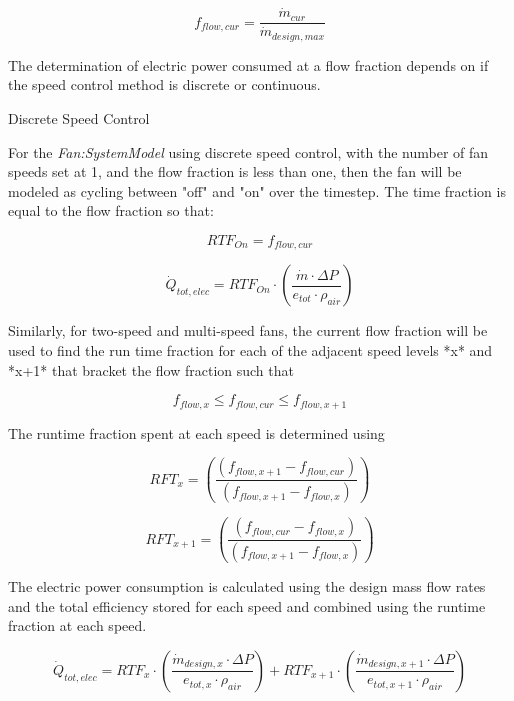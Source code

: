 \begin{equation}
{f_{flow, cur}} = \frac{\dot m_{cur}}{\dot m_{design,max}}
\end{equation}

The determination of electric power consumed at a flow fraction depends on if the speed control method is discrete or continuous.

Discrete Speed Control 

For the \emph{Fan:SystemModel} using discrete speed control, with the number of fan speeds set at 1, and the flow fraction is less than one, then the fan will be modeled as cycling between "off" and "on" over the timestep.  The time fraction is equal to the flow fraction so that:
 
\begin{equation}
{RTF_{On}} = {f_{flow, cur}}
\end{equation}

\begin{equation}
{\dot Q_{tot,elec}} = {RTF_{On}} \cdot \left( \frac{\dot m\cdot \Delta P}{{e_{tot}}\cdot {\rho_{air}}}\right)
\end{equation}

Similarly, for two-speed and multi-speed fans, the current flow fraction will be used to find the run time fraction for each of the adjacent speed levels *x* and *x+1* that bracket the flow fraction such that

\begin{equation}
{f_{flow,x}} \leq {f_{flow, cur}} \leq {f_{flow,x+1}}
\end{equation}

The runtime fraction spent at each speed is determined using

\begin{equation}
{RFT_{x}} = \left( \frac{({f_{flow,x+1}} - {f_{flow, cur}} )}{({f_{flow,x+1}} - {f_{flow,x}})}  \right)
\end{equation}

\begin{equation}
{RFT_{x+1}} = \left( \frac{({f_{flow, cur}} - {f_{flow,x}} )}{({f_{flow,x+1}} - {f_{flow,x}})}  \right)
\end{equation}

The electric power consumption is calculated using the design mass flow rates and the total efficiency stored for each speed and combined using the runtime fraction at each speed.

\begin{equation}
{\dot Q_{tot,elec}} = {RTF_{x}} \cdot \left( \frac{\dot m_{design,x}\cdot \Delta P}{{e_{tot,x}}\cdot {\rho_{air}}}\right)  +  {RTF_{x+1}} \cdot \left( \frac{\dot m_{design,x+1}\cdot \Delta P}{{e_{tot,x+1}}\cdot {\rho_{air}}}\right)
\end{equation}

